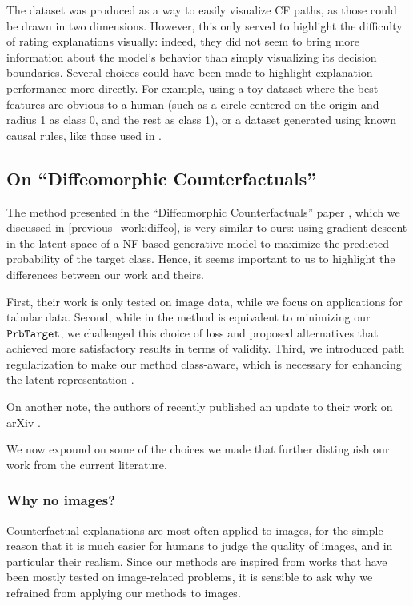 \documentclass[../main.tex]{subfiles}
\begin{document}
The \CakeOnSea{} dataset was produced as a way to easily visualize CF paths, as those could be drawn in two dimensions.
However, this only served to highlight the difficulty of rating explanations visually: indeed, they did not seem to bring more information about the model's behavior than simply visualizing its decision boundaries.
Several choices could have been made to highlight explanation performance more directly.
For example, using a toy dataset where the best features are obvious to a human (such as a circle centered on the origin and radius 1 as class 0, and the rest as class 1), or a dataset generated using known causal rules, like those used in \cite{karimiAlgorithmic2020}.

\subsection{On ``Diffeomorphic Counterfactuals''}

The method presented in the ``Diffeomorphic Counterfactuals'' paper \cite{dombrowskiDiffeomorphic2021}, which we discussed in \autoref{previous_work:diffeo},
is very similar to ours: using gradient descent in the latent space of a NF-based generative model to maximize the predicted probability of the target class.
Hence, it seems important to us to highlight the differences between our work and theirs.

First, their work is only tested on image data, while we focus on applications for tabular data.
Second, while in \cite{dombrowskiDiffeomorphic2021} the method is equivalent to minimizing our $\mathtt{PrbTarget}{}$, we challenged this choice of loss and proposed alternatives that achieved more satisfactory results in terms of validity.
Third, we introduced path regularization to make our method class-aware, which is necessary for enhancing the latent representation \cite{locatelloChallenging2019}.

On another note, the authors of \cite{dombrowskiDiffeomorphic2021} recently published an update to their work on arXiv \cite{dombrowskiDiffeomorphic2022}.

We now expound on some of the choices we made that further distinguish our work from the current literature.

\subsubsection{Why no images?}

Counterfactual explanations are most often applied to images, for the simple reason that it is much easier for humans to judge the quality of images, and in particular their realism.
Since our methods are inspired from works that have been mostly tested on image-related problems, it is sensible to ask why we refrained from applying our methods to images.
\end{document}
